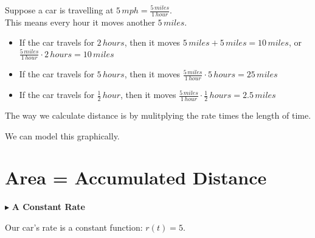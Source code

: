 \documentclass{ximera}
\begin{document}
Suppose a car is travelling at $5 \, mph = \frac{5 \, miles}{1 \, hour}$. \\

This means every hour it moves another $5 \, miles$. \\

\begin{itemize}
\item If the car travels for $2 \, hours$, then it moves $5 \, miles + 5 \, miles = 10 \, miles$, or $\frac{5 \, miles}{1 \, hour} \cdot 2 \, hours = 10 \, miles$

\item If the car travels for $5 \, hours$, then it moves $\frac{5 \, miles}{1 \, hour} \cdot 5 \, hours = 25 \, miles$

\item If the car travels for $\frac{1}{2} \, hour$, then it moves $\frac{5 \, miles}{1 \, hour} \cdot \frac{1}{2} \, hours = 2.5 \,miles$
\end{itemize}


The way we calculate distance is by mulitplying the rate times the length of time.

We can model this graphically.










\section*{Area = Accumulated Distance}



$\blacktriangleright$ \textbf{A Constant Rate}



Our car's rate is a constant function: $r(t) = 5$. \\
\end{document}
